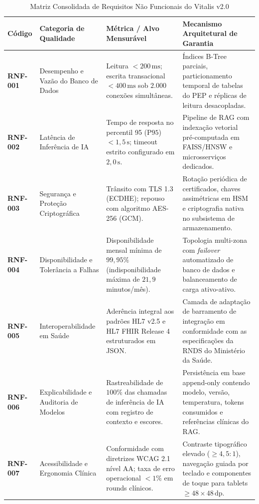 \begin{table}[H]
\centering
\small
\caption{Matriz Consolidada de Requisitos Não Funcionais do Vitalis v2.0}
\label{tab:rnf_vitalis}
\begin{tabularx}{\textwidth}{l >{\raggedright\arraybackslash}p{3.5cm} >{\raggedright\arraybackslash}p{4.2cm} >{\raggedright\arraybackslash}X}
\toprule
\textbf{Código} & \textbf{Categoria de Qualidade} & \textbf{Métrica / Alvo Mensurável} & \textbf{Mecanismo Arquitetural de Garantia} \\
\midrule
\textbf{RNF-001} & Desempenho e Vazão do Banco de Dados & Leitura $< 200\,\text{ms}$; escrita transacional $< 400\,\text{ms}$ sob $2.000$ conexões simultâneas. & Índices B-Tree parciais, particionamento temporal de tabelas do PEP e réplicas de leitura desacopladas. \\
\addlinespace
\textbf{RNF-002} & Latência de Inferência de IA & Tempo de resposta no percentil 95 ($\text{P95}$) $< 1{,}5\,\text{s}$; timeout estrito configurado em $2{,}0\,\text{s}$. & Pipeline de RAG com indexação vetorial pré-computada em FAISS/HNSW e microsserviços dedicados. \\
\addlinespace
\textbf{RNF-003} & Segurança e Proteção Criptográfica & Trânsito com TLS 1.3 (ECDHE); repouso com algoritmo AES-256 (GCM). & Rotação periódica de certificados, chaves assimétricas em HSM e criptografia nativa no subsistema de armazenamento. \\
\addlinespace
\textbf{RNF-004} & Disponibilidade e Tolerância a Falhas & Disponibilidade mensal mínima de $99{,}95\%$ (indisponibilidade máxima de $21{,}9$ minutos/mês). & Topologia multi-zona com \textit{failover} automatizado de banco de dados e balanceamento de carga ativo-ativo. \\
\addlinespace
\textbf{RNF-005} & Interoperabilidade em Saúde & Aderência integral aos padrões HL7 v2.5 e HL7 FHIR Release 4 estruturados em JSON. & Camada de adaptação de barramento de integração em conformidade com as especificações da RNDS do Ministério da Saúde. \\
\addlinespace
\textbf{RNF-006} & Explicabilidade e Auditoria de Modelos & Rastreabilidade de $100\%$ das chamadas de inferência de IA com registro de contexto e escores. & Persistência em base append-only contendo modelo, versão, temperatura, tokens consumidos e referências clínicas do RAG. \\
\addlinespace
\textbf{RNF-007} & Acessibilidade e Ergonomia Clínica & Conformidade com diretrizes WCAG 2.1 nível AA; taxa de erro operacional $< 1\%$ em rounds clínicos. & Contraste tipográfico elevado ($\ge 4{,}5:1$), navegação guiada por teclado e componentes de toque para tablets $\ge 48 \times 48\,\text{dp}$. \\
\bottomrule
\end{tabularx}
\end{table}

